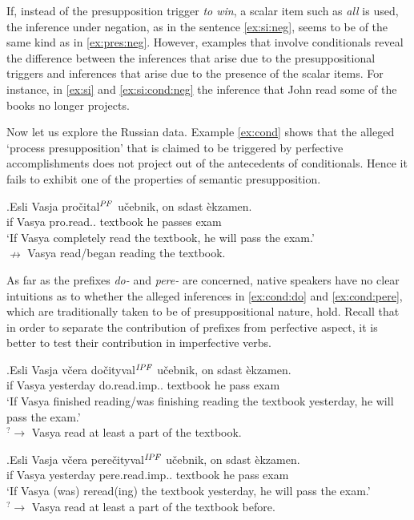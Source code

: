 If, instead of the presupposition trigger \textit{to win}, a scalar item such as \textit{all} is used, the inference under negation, as in the sentence \ref{ex:si:neg}, seems to be of the same kind as in \ref{ex:pres:neg}. However, examples that involve conditionals reveal the difference between the inferences that arise due to the presuppositional triggers and inferences that arise due to the presence of the scalar items. For instance, in \ref{ex:si} and \ref{ex:si:cond:neg} the inference that John read some of the books no longer projects.

Now let us explore the Russian data. Example \ref{ex:cond} shows that the alleged `process presupposition' that is claimed to be triggered by perfective accomplishments does not project out of the antecedents of conditionals. Hence it fails to exhibit one of the properties of semantic presupposition.

\exg.\label{ex:cond}Esli Vasja pro\v{c}ital$^{\mathit{PF}}$ u\v{c}ebnik, on sdast \`{e}kzamen.\\
if Vasya pro.read.. textbook he passes exam\\
\vspace{0.5em}
 `If Vasya completely read the textbook, he will pass the exam.'\\
$\nrightarrow$ Vasya read/began reading the textbook.

As far as the prefixes \textit{do-} and \textit{pere-} are concerned, native speakers have no clear intuitions as to whether the alleged inferences in \ref{ex:cond:do} and \ref{ex:cond:pere}, which are traditionally taken to be of presuppositional nature, hold. Recall that in order to separate the contribution of prefixes from perfective aspect, it is better to test their contribution in imperfective verbs.

\exg.\label{ex:cond:do}Esli Vasja v\v{c}era do\v{c}ityval$^{\mathit{IPF}}$ u\v{c}ebnik, on sdast \`{e}kzamen.\\
if Vasya yesterday do.read.imp.. textbook he pass exam\\
\vspace{0.5em}
 `If Vasya finished reading/was finishing reading the textbook yesterday, he will pass the exam.'\\
$^?\rightarrow$ Vasya read at least a part of the textbook.

\exg.\label{ex:cond:pere}Esli Vasja v\v{c}era pere\v{c}ityval$^{\mathit{IPF}}$ u\v{c}ebnik, on sdast \`{e}kzamen.\\
if Vasya yesterday pere.read.imp.. textbook he pass exam\\
\vspace{0.5em}
 `If Vasya (was) reread(ing) the textbook yesterday, he will pass the exam.'\\
$^?\rightarrow$ Vasya read at least a part of the textbook before.


